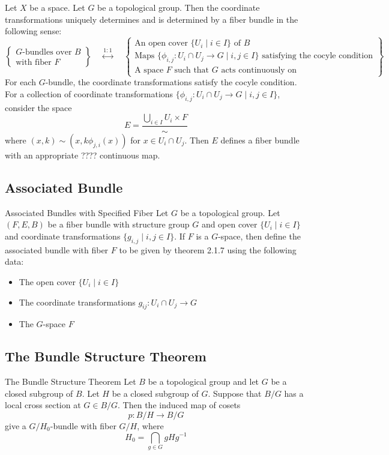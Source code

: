 \documentclass[a4paper]{article}
\begin{document}
\begin{thm}{}{} Let $X$ be a space. Let $G$ be a topological group. Then the coordinate transformations uniquely determines and is determined by a fiber bundle in the following sense: $$\left\{\substack{G\text{-bundles over }B\\\text{with fiber }F}\right\}\;\;\;\;\overset{1:1}{\longleftrightarrow}\;\;\;\;\left\{\substack{\text{An open cover }\{U_i\;|\;i\in I\}\text{ of }B\\\text{Maps }\{\phi_{i,j}:U_i\cap U_j\to G\;|\;i,j\in I\}\text{ satisfying the cocyle condition}\\\text{A space }F\text{ such that }G\text{ acts continuously on}}\right\}$$ For each $G$-bundle, the coordinate transformations satisfy the cocyle condition. For a collection of coordinate transformations $\{\phi_{i,j}:U_i\cap U_j\to G\;|\;i,j\in I\}$, consider the space $$E=\frac{\bigcup_{i\in I}U_i\times F}{\sim}$$ where $(x,k)\sim(x,k\phi_{j,i}(x))$ for $x\in U_i\cap U_j$. Then $E$ defines a fiber bundle with an appropriate ???? continuous map. 
\end{thm}

\subsection{Associated Bundle}
\begin{defn}{Associated Bundles with Specified Fiber}{} Let $G$ be a topological group. Let $(F,E,B)$ be a fiber bundle with structure group $G$ and open cover $\{U_i\;|\;i\in I\}$ and coordinate transformations $\{g_{i,j}\;|\;i,j\in I\}$. If $F$ is a $G$-space, then define the associated bundle with fiber $F$ to be given by theorem 2.1.7 using the following data: 
\begin{itemize}
\item The open cover $\{U_i\;|\;i\in I\}$
\item The coordinate transformations $g_{ij}:U_i\cap U_j\to G$
\item The $G$-space $F$
\end{itemize}
\end{defn}

\subsection{The Bundle Structure Theorem}
\begin{thm}{The Bundle Structure Theorem}{} Let $B$ be a topological group and let $G$ be a closed subgroup of $B$. Let $H$ be a closed subgroup of $G$. Suppose that $B/G$ has a local cross section at $G\in B/G$. Then the induced map of cosets $$p:B/H\to B/G$$ give a $G/H_0$-bundle with fiber $G/H$, where $$H_0=\bigcap_{g\in G}gHg^{-1}$$
\end{thm}
\end{document}
